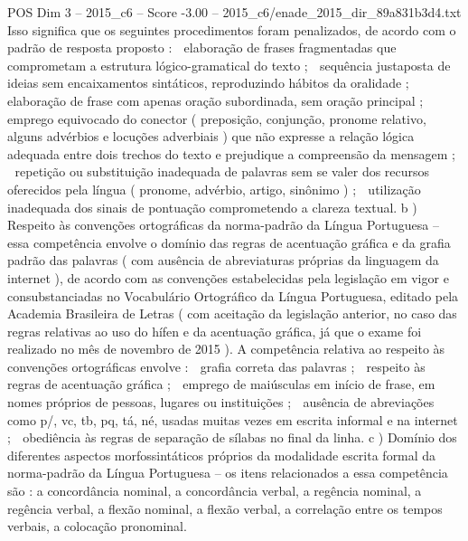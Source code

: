\begin{textsample}{POS Dim 3 – 2015\_c6 – Score -3.00 – 2015\_c6/enade\_2015\_dir\_89a831b3d4.txt}
Isso significa que os seguintes procedimentos foram penalizados, de acordo com o padrão de resposta proposto :  elaboração de frases fragmentadas que comprometam a estrutura lógico-gramatical do texto ;  sequência justaposta de ideias sem encaixamentos sintáticos, reproduzindo hábitos da oralidade ;  elaboração de frase com apenas oração subordinada, sem oração principal ;  emprego equivocado do conector ( preposição, conjunção, pronome relativo, alguns advérbios e locuções adverbiais ) que não expresse a relação lógica adequada entre dois trechos do texto e prejudique a compreensão da mensagem ;  repetição ou substituição inadequada de palavras sem se valer dos recursos oferecidos pela língua ( pronome, advérbio, artigo, sinônimo ) ;  utilização inadequada dos sinais de pontuação comprometendo a clareza textual. b ) Respeito às convenções ortográficas da norma-padrão da Língua Portuguesa – essa competência envolve o domínio das regras de acentuação gráfica e da grafia padrão das palavras ( com ausência de abreviaturas próprias da linguagem da internet ), de acordo com as convenções estabelecidas pela legislação em vigor e consubstanciadas no Vocabulário Ortográfico da Língua Portuguesa, editado pela Academia Brasileira de Letras ( com aceitação da legislação anterior, no caso das regras relativas ao uso do hífen e da acentuação gráfica, já que o exame foi realizado no mês de novembro de 2015 ).
A competência relativa ao respeito às convenções ortográficas envolve :  grafia correta das palavras ;  respeito às regras de acentuação gráfica ;  emprego de maiúsculas em início de frase, em nomes próprios de pessoas, lugares ou instituições ;  ausência de abreviações como p/, vc, tb, pq, tá, né, usadas muitas vezes em escrita informal e na internet ;  obediência às regras de separação de sílabas no final da linha. c ) Domínio dos diferentes aspectos morfossintáticos próprios da modalidade escrita formal da norma-padrão da Língua Portuguesa – os itens relacionados a essa competência são : a concordância nominal, a concordância verbal, a regência nominal, a regência verbal, a flexão nominal, a flexão verbal, a correlação entre os tempos verbais, a colocação pronominal.

\end{textsample}
